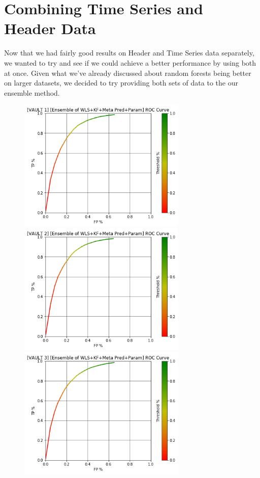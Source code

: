\section{Combining Time Series and Header Data}

Now that we had fairly good results on Header and Time Series data separately, we wanted to try and see if we could achieve a better performance by using both at once. Given what we've already discussed about random forests being better on larger datasets, we decided to try providing both sets of data to the our ensemble method.

\begin{figure}[h]
\centering
\includegraphics[width=8cm]{body/results/Graphs/Meta+Series/Raw/v1.png}
\includegraphics[width=8cm]{body/results/Graphs/Meta+Series/Raw/v2.png}
\includegraphics[width=8cm]{body/results/Graphs/Meta+Series/Raw/v3.png}

\end{figure}
